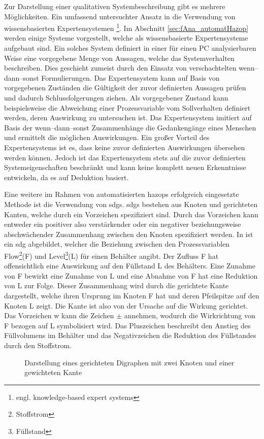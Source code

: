 Zur Darstellung einer qualitativen Systembeschreibung gibt es mehrere M\"oglichkeiten. Ein umfassend untersuchter Ansatz in die Verwendung von wissensbasierten Expertensystemen \footnote{engl. knowledge-based expert systems}. Im Abschnitt \ref{sec:fAna_automatHazop} werden einige Systeme vorgestellt, welche als wissensbasierte Expertensysteme aufgebaut sind. Ein solches System definiert in einer f\"ur einen PC analysierbaren Weise eine vorgegebene Menge von Aussagen, welche das Systemverhalten beschreiben. Dies geschieht zumeist durch den Einsatz von verschachtelten wenn--dann--sonst Formulierungen. Das Expertensystem kann auf Basis von vorgegebenen Zust\"anden die G\"ultigkeit der zuvor definierten Aussagen pr\"ufen und dadurch Schlussfolgerungen ziehen. Als vorgegebener Zustand kann beispielsweise die Abweichung einer Prozessvariable vom Sollverhalten definiert werden, deren Auswirkung zu untersuchen ist. Das Expertensystem imitiert auf Basis der wenn--dann--sonst Zusammenh\"ange die Gedankeng\"ange eines Menschen und ermittelt die m\"oglichen Auswirkungen. Ein gro\ss{}er Vorteil des Expertensystems ist es, dass keine zuvor definierten Auswirkungen \"ubersehen werden k\"onnen. Jedoch ist das Expertensystem stets auf die zuvor definierten Systemeigenschaften beschr\"ankt und kann keine komplett neuen Erkenntnisse entwickeln, da es auf Deduktion basiert.

Eine weitere im Rahmen von automatisierten \acp{hazop} erfolgreich eingesetzte Methode ist die Verwendung von \acp{sdg}. \acp{sdg} bestehen aus Knoten und gerichteten Kanten, welche durch ein Vorzeichen spezifiziert sind. Durch das Vorzeichen kann entweder ein positiver also verst\"arkender oder ein negativer beziehungsweise abschw\"achender Zusammenhang zwischen den Knoten spezifiziert werden. In  ist ein \ac{sdg} abgebildet, welcher die Beziehung zwischen den Prozessvariablen \glqq Flow\footnote{Stoffstrom}\grqq { }(F) und \glqq Level\footnote{F\"ullstand}\grqq { }(L) f\"ur einen Beh\"alter angibt. Der Zufluss F hat offensichtlich eine Auswirkung auf den F\"ullstand L des Beh\"alters. Eine Zunahme von F bewirkt eine Zunahme von L und eine Abnahme von F hat eine Reduktion von L zur Folge. Dieser Zusammenhang wird durch die gerichtete Kante dargestellt, welche ihren Ursprung im Knoten F hat und deren Pfeilspitze auf den Knoten L zeigt. Die Kante ist also von der Ursache auf die Wirkung gerichtet. Das Vorzeichen w kann die Zeichen $\pm$ annehmen, wodurch die Wirkrichtung von F bezogen auf L symbolisiert wird. Das Pluszeichen beschreibt den Anstieg des F\"ullvolumens im Beh\"alter und das Negativzeichen die Reduktion des F\"ullstandes durch den Stoffstrom.
\begin{figure}[h!tb]
\centering
	
	\caption[Beispiel f\"ur einen gerichteten Digraphen]{Darstellung eines gerichteten Digraphen mit zwei Knoten und einer gewichteten Kante}
	\label{fig:fAna_digraph}
\end{figure}

